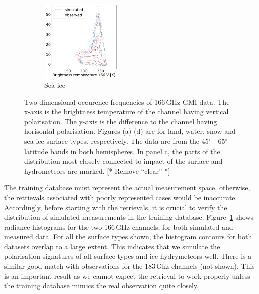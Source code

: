 \documentclass[12pt,oneside,a4paper]{article}
\newcommand\intodo[1]{{\color{red} [* #1 *]}}
\begin{document}
\begin{figure}[t]
\begin{subfigure}{.24\textwidth}
	\caption{ Sea-ice}
	\includegraphics[height = 39mm, width = 39mm]{Figures/hist2d_gmi_highlat_sea-ice.pdf}
\end{subfigure}
\caption{Two-dimensional occurence frequencies of 166\,GHz GMI data. The x-axis
  is the brightness temperature of the channel having vertical polarisation.
  The y-axis is the difference to the channel having horisontal polarisation.
  Figures (a)-(d) are for land, water, snow and sea-ice surface types,
  respectively. The data are from the 45$^\circ$ - 65$^\circ$ latitude bands in
  both hemispheres. In panel c, the parts of the distribution most closely
  connected to impact of the surface and hydrometeors are marked.\intodo{Remove
    ``clear''}}
  \label{fig:histogram_2d}
\end{figure}

The training database must represent the actual measurement space, otherwise,
the retrievals associated with poorly represented cases would be inaccurate.
Accordingly, before starting with the retrievals, it is crucial to verify the
distribution of simulated measurements in the training database.
Figure~\ref{fig:histogram_2d} shows radiance histograms for the two 166\,GHz
channels, for both simulated and measured data. For all the surface types
shown, the histogram contours for both datasets overlap to a large extent. This
indicates that we simulate the polarisation signatures of all surface types and
ice hydrymeteors well. There is a similar good match with observations for the
183\,Ghz channels (not shown). This is an important result as we cannot expect
the retrieval to work properly unless the training database mimics the real
observation quite closely.
\end{document}
